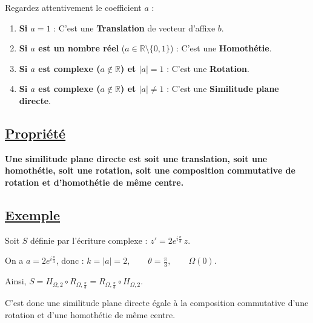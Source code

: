 \documentclass[12pt,a4paper]{article}
\begin{document}
\begin{tcolorbox}[colback=blue!5,colframe=blue!75!black,title=Méthode de reconnaissance]
Regardez attentivement le coefficient \textbf{$a$} :
\begin{enumerate}
    \item \textbf{Si $a = 1$} : C'est une \textbf{Translation} de vecteur d'affixe $b$.
    \item \textbf{Si $a$ est un nombre réel} ($a \in \mathbb{R} \setminus \{0, 1\}$) : C'est une \textbf{Homothétie}.
    \item \textbf{Si $a$ est complexe ($a \notin \mathbb{R}$) et $|a| = 1$} : C'est une \textbf{Rotation}.
    \item \textbf{Si $a$ est complexe ($a \notin \mathbb{R}$) et $|a| \neq 1$} : C'est une \textbf{Similitude plane directe}.
\end{enumerate}
\end{tcolorbox}

\subsection*{ \underline{Propriété}}
\textbf{Une similitude plane directe est soit une translation, soit une homothétie, soit une rotation, soit une composition commutative de rotation et d'homothétie de même centre.}
\subsection*{\underline{Exemple}}

Soit $S$ définie par l'écriture complexe :
$
z' = 2e^{i\frac{\pi}{3}}\,z.
$

On a $a = 2e^{i\frac{\pi}{3}}$, donc :
$
k = |a| = 2, \qquad \theta = \frac{\pi}{3}, \qquad \Omega(0).
$

Ainsi,
$
S = H_{\Omega,2} \circ R_{\Omega,\frac{\pi}{3}}
= R_{\Omega,\frac{\pi}{3}} \circ H_{\Omega,2}.
$

C'est donc une similitude plane directe égale à la composition commutative
d'une rotation et d'une homothétie de même centre.
\end{document}
